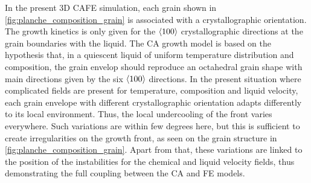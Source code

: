 In the present 3D CAFE simulation, each grain shown in \cref{fig:planche_composition_grain} 
is associated with a crystallographic orientation. 
The growth kinetics is only given for the $\left \langle 100 \right \rangle$ crystallographic directions at the grain boundaries with the liquid. The CA growth model 
is based on the hypothesis that, in a quiescent liquid of uniform temperature distribution and composition, the grain envelop should 
reproduce an octahedral grain shape with main directions given by the six $\left \langle 100 \right \rangle$ directions. In the present situation where complicated 
fields are present for temperature, composition and liquid velocity, each grain envelope with different crystallographic orientation 
adapts differently to its local environment. Thus, the local undercooling of the front varies everywhere. Such variations are within 
few degrees here, but this is sufficient to create irregularities on the growth front, as seen on the grain structure in \cref{fig:planche_composition_grain}. 
Apart from that, these variations are linked to the position of the instabilities for the chemical and liquid velocity fields, thus 
demonstrating the full coupling between the CA and FE models.
%
%
